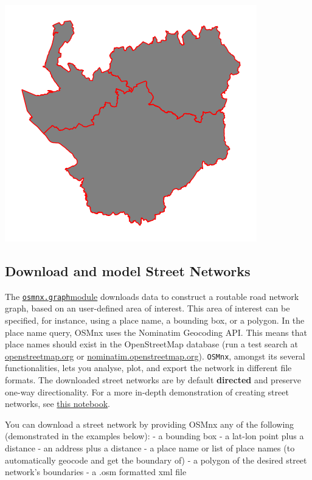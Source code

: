 \documentclass[
  letterpaper,
  DIV=11,
  numbers=noendperiod]{scrreprt}
\begin{document}
\includegraphics{labs/w07_OSM_files/figure-pdf/cell-5-output-1.png}

\subsection{Download and model Street
Networks}\label{download-and-model-street-networks}

The
\href{https://osmnx.readthedocs.io/en/stable/osmnx.html\#module-osmnx.graph}{\texttt{osmnx.graph}module}
downloads data to construct a routable road network graph, based on an
user-defined area of interest. This area of interest can be specified,
for instance, using a place name, a bounding box, or a polygon. In the
place name query, OSMnx uses the Nominatim Geocoding API. This means
that place names should exist in the OpenStreetMap database (run a test
search at \href{https://www.openstreetmap.org/}{openstreetmap.org} or
\href{https://nominatim.openstreetmap.org/ui/search.html}{nominatim.openstreetmap.org}).
\texttt{OSMnx}, amongst its several functionalities, lets you analyse,
plot, and export the network in different file formats. The downloaded
street networks are by default \textbf{directed} and preserve one-way
directionality. For a more in-depth demonstration of creating street
networks, see \href{03-graph-place-queries.ipynb}{this notebook}.

You can download a street network by providing OSMnx any of the
following (demonstrated in the examples below): - a bounding box - a
lat-lon point plus a distance - an address plus a distance - a place
name or list of place names (to automatically geocode and get the
boundary of) - a polygon of the desired street network's boundaries - a
.osm formatted xml file
\end{document}
